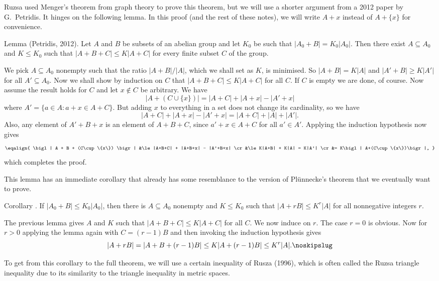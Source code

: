 Ruzsa used Menger's theorem from graph theory to prove this theorem, but we will use a shorter
argument from a 2012 paper by G.~Petridis. It hinges on the following lemma. In this proof (and the
rest of these notes), we will write $A+x$ instead of $A+\{x\}$ for convenience.

\edef\lempetridis{\the\thmcount}
\parenproclaim Lemma {\advthm} (Petridis, {\rm 2012}). Let $A$ and $B$ be subsets of an abelian
group and let $K_0$ be such that $|A_0+B| = K_0|A_0|$. Then there exist $A\subseteq A_0$ and
$K\le K_0$ such that $|A+B+C| \le K|A+C|$ for every finite subset $C$ of the group.

\proof We pick $A\subseteq A_0$ nonempty such that the ratio $|A+B|/|A|$, which we shall
set as $K$, is minimised. So $|A+B| = K|A|$ and $|A'+B|\ge K|A'|$ for all $A'\subseteq A_0$.
Now we shall show by induction on $C$ that $|A+B+C|\le K|A+C|$ for all $C$. If $C$ is empty we
are done, of course. Now assume the result holds for $C$ and let $x\notin C$ be arbitrary. We have
$$\bigl| A+(C\cup \{x\}) \bigr| = |A+C| + |A+x| - |A'+x|$$
where $A' = \{a\in A : a+x \in A+C\}$. But adding $x$ to everything in a set does not change its
cardinality, so we have
$$|A+C| + |A+x|-|A'+x| = |A+C| + |A| + |A'|.$$
Also, any element of $A'+B+x$ is an element of $A+B+C$, since $a'+x\in A+C$ for all $a'\in A'$.
Applying the induction hypothesis now gives
$$\eqalign{
\bigl| A + B + (C\cup \{x\}) \bigr| &\le |A+B+C| + |A+B+x| - |A'+B+x| \cr
&\le K|A+B| + K|A| = K|A'| \cr
&= K\bigl| A+(C\cup \{x\})\bigr|,
}$$
which completes the proof.\slug

This lemma has an immediate corollary that already has some resemblance to the version of Pl\"unnecke's
theorem that we eventually want to prove.

\proclaim Corollary {\advthm}. If $|A_0 + B|\le K_0|A_0|$, then there is $A\subseteq A_0$ nonempty
and $K\le K_0$ such that $|A+rB| \le K^r |A|$ for all nonnegative integers $r$.

\proof The previous lemma gives $A$ and $K$ such that $|A+B+C|\le K|A+C|$ for all $C$. We now induce
on $r$. The case $r=0$ is obvious. Now for $r>0$ applying the lemma again with $C = (r-1)B$ and
then invoking the induction hypothesis gives
$$|A+rB| = |A+B+(r-1)B| \le K|A+(r-1)B| \le K^r|A|.\noskipslug$$

To get from this corollary to the full theorem, we will use a certain inequality of Rusza (1996), which
is often called the Ruzsa triangle inequality due to its similarity to the triangle inequality in
metric spaces.

